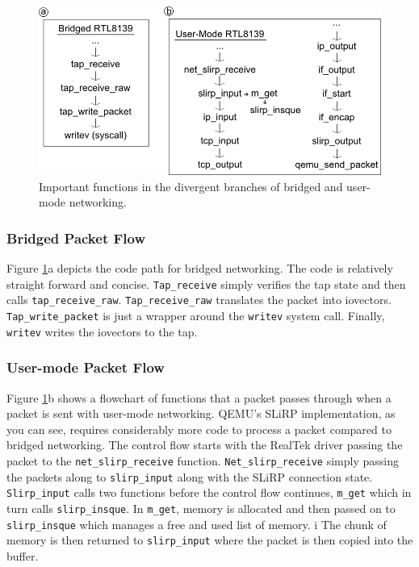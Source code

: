 \begin{figure}[!ht]
	\centering
		\includegraphics[scale=0.6]{codepath2_alt}
	\caption{Important functions in the divergent branches of bridged and user-mode networking.}
	\label{fig:codepath2}
\end{figure}
\subsubsection{Bridged Packet Flow}
Figure \ref{fig:codepath2}a depicts the code path for bridged networking.
The code is relatively straight forward and concise.
\texttt{Tap\_receive} simply verifies the tap state and then calls \texttt{tap\_receive\_raw}.
\texttt{Tap\_receive\_raw} translates the packet into iovectors.
\texttt{Tap\_write\_packet} is just a wrapper around the \texttt{writev} system call.
Finally, \texttt{writev} writes the iovectors to the tap.

\subsubsection{User-mode Packet Flow}

Figure \ref{fig:codepath2}b shows a flowchart of functions that a packet passes through when a packet is sent with user-mode networking.
QEMU's SLiRP implementation, as you can see, requires considerably more code to process a packet compared to bridged networking.
The control flow starts with the RealTek driver passing the packet to the \texttt{net\_slirp\_receive} function.
\texttt{Net\_slirp\_receive} simply passing the packets along to \texttt{slirp\_input} along with the SLiRP connection state.
\texttt{Slirp\_input} calls two functions before the control flow continues, \texttt{m\_get} which in turn calls \texttt{slirp\_insque}.
In \texttt{m\_get}, memory is allocated and then passed on to \texttt{slirp\_insque} which manages a free and used list of memory.
i%
The chunk of memory is then returned to \texttt{slirp\_input} where the packet is then copied into the buffer.

